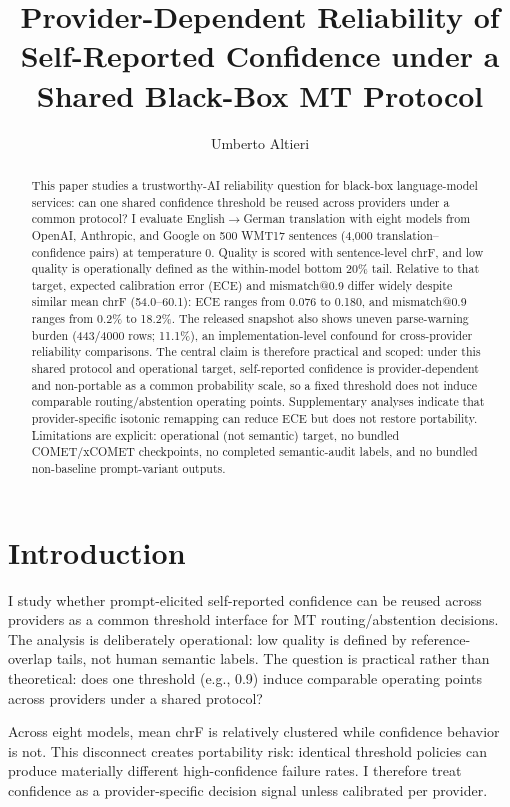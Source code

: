 \documentclass[10pt,conference]{IEEEtran}
\title{Provider-Dependent Reliability of Self-Reported Confidence under a Shared Black-Box MT Protocol}
\author{Umberto Altieri}
\date{}
\begin{document}
\maketitle
\begin{abstract}
This paper studies a trustworthy-AI reliability question for black-box language-model services: can one shared confidence threshold be reused across providers under a common protocol? I evaluate English$\rightarrow$German translation with eight models from OpenAI, Anthropic, and Google on 500 WMT17 sentences (4,000 translation--confidence pairs) at temperature 0. Quality is scored with sentence-level chrF, and low quality is operationally defined as the within-model bottom 20\% tail. Relative to that target, expected calibration error (ECE) and mismatch@0.9 differ widely despite similar mean chrF (54.0--60.1): ECE ranges from 0.076 to 0.180, and mismatch@0.9 ranges from 0.2\% to 18.2\%. The released snapshot also shows uneven parse-warning burden (443/4000 rows; 11.1\%), an implementation-level confound for cross-provider reliability comparisons. The central claim is therefore practical and scoped: under this shared protocol and operational target, self-reported confidence is provider-dependent and non-portable as a common probability scale, so a fixed threshold does not induce comparable routing/abstention operating points. Supplementary analyses indicate that provider-specific isotonic remapping can reduce ECE but does not restore portability. Limitations are explicit: operational (not semantic) target, no bundled COMET/xCOMET checkpoints, no completed semantic-audit labels, and no bundled non-baseline prompt-variant outputs.
\end{abstract}

\section{Introduction}
I study whether prompt-elicited self-reported confidence can be reused across providers as a common threshold interface for MT routing/abstention decisions. The analysis is deliberately operational: low quality is defined by reference-overlap tails, not human semantic labels. The question is practical rather than theoretical: does one threshold (e.g., 0.9) induce comparable operating points across providers under a shared protocol?

Across eight models, mean chrF is relatively clustered while confidence behavior is not. This disconnect creates portability risk: identical threshold policies can produce materially different high-confidence failure rates. I therefore treat confidence as a provider-specific decision signal unless calibrated per provider.
\end{document}
